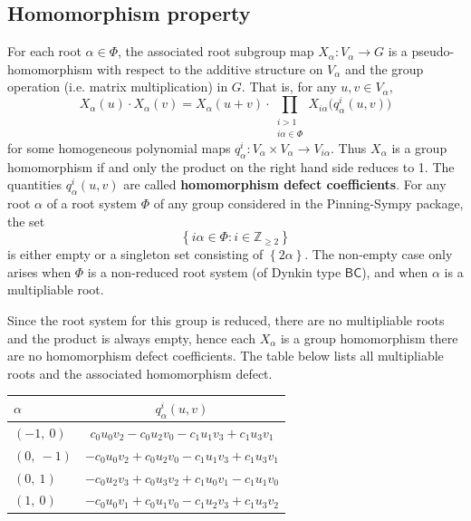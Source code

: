 \documentclass[11pt]{article}
\newcommand{\noi}{\noindent}
\newcommand{\tbf}{\textbf}
\newcommand{\lb}{\left\{}
\newcommand{\rb}{\right\}}
\newcommand{\Z}{\mathbb{Z}}
\theoremstyle{definition}
\newif\ifrootsystemreduced
\begin{document}
\subsection{Homomorphism property}

\noi For each root $\alpha \in \Phi$, the associated root subgroup map $X_\alpha:V_\alpha \to G$ is a pseudo-homomorphism with respect to the additive structure on $V_\alpha$ and the group operation (i.e. matrix multiplication) in $G$. That is, for any $u,v \in V_\alpha$,
\begin{equation}
\label{pseudo homomorphism}
	X_\alpha(u) \cdot X_\alpha(v) = X_\alpha(u+v) \cdot \prod_{\substack{i > 1 \\ i \alpha \in \Phi}} X_{i \alpha} \Big( q^i_\alpha(u,v) \Big)
\end{equation}
for some homogeneous polynomial maps $q^i_\alpha:V_\alpha \times V_\alpha \to V_{i \alpha}$. Thus $X_\alpha$ is a group homomorphism if and only the product on the right hand side reduces to 1. The quantities $q^i_\alpha(u,v)$ are called \tbf{homomorphism defect coefficients}. For any root $\alpha$ of a root system $\Phi$ of any group considered in the Pinning-Sympy package, the set
\[
	\lb i \alpha \in \Phi : i \in \Z_{\ge 2} \rb
\]
is either empty or a singleton set consisting of $\lb 2 \alpha \rb$. The non-empty case only arises when $\Phi$ is a non-reduced root system (of Dynkin type $\mathsf{BC}$), and when $\alpha$ is a multipliable root. 

\ifrootsystemreduced
Since the root system for this group is reduced, there are no multipliable roots and the product is always empty, hence each $X_\alpha$ is a group homomorphism there are no homomorphism defect coefficients.
\else
The table below lists all multipliable roots and the associated homomorphism defect.

\bigskip

\noindent \begin{tabular}{|l|c|}
    \hline
    $\alpha$ & $q^i_\alpha(u,v)$ \\
    \hline
    $\left( -1, \  0\right)$ & ${c_{0} u_{0} v_{2} - c_{0} u_{2} v_{0} - c_{1} u_{1} v_{3} + c_{1} u_{3} v_{1}}$ \\
    \hline
    $\left( 0, \  -1\right)$ & ${- c_{0} u_{0} v_{2} + c_{0} u_{2} v_{0} - c_{1} u_{1} v_{3} + c_{1} u_{3} v_{1}}$ \\
    \hline
    $\left( 0, \  1\right)$ & ${- c_{0} u_{2} v_{3} + c_{0} u_{3} v_{2} + c_{1} u_{0} v_{1} - c_{1} u_{1} v_{0}}$ \\
    \hline
    $\left( 1, \  0\right)$ & ${- c_{0} u_{0} v_{1} + c_{0} u_{1} v_{0} - c_{1} u_{2} v_{3} + c_{1} u_{3} v_{2}}$ \\
    \hline
\end{tabular}
\end{document}
